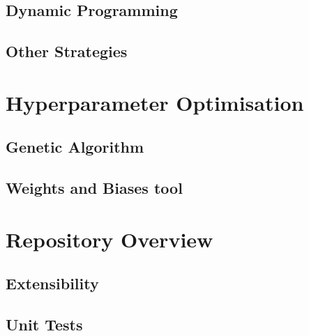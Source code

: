 \subsection{Dynamic Programming}


\subsection{Other Strategies}



\section{Hyperparameter Optimisation}


\subsection{Genetic Algorithm}


\subsection{Weights and Biases tool}


\section{Repository Overview}


\subsection{Extensibility}

\subsection{Unit Tests}

